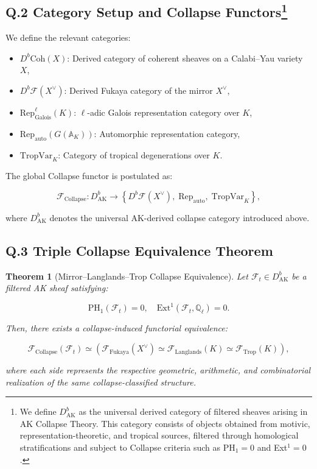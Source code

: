 \documentclass[11pt]{article}
\newtheorem{theorem}{Theorem}[section]
\begin{document}
\subsection*{Q.2 Category Setup and Collapse Functors\footnote{%
We define $D^b_{\mathrm{AK}}$ as the universal derived category of filtered sheaves arising in AK Collapse Theory. 
This category consists of objects obtained from motivic, representation-theoretic, and tropical sources, filtered through homological stratifications and subject to Collapse criteria such as PH$_1 = 0$ and Ext$^1 = 0$.
}}

We define the relevant categories:

\begin{itemize}
  \item $D^b\mathrm{Coh}(X)$: Derived category of coherent sheaves on a Calabi–Yau variety $X$,
  \item $D^b\mathcal{F}(X^\vee)$: Derived Fukaya category of the mirror $X^\vee$,
  \item $\mathrm{Rep}^\ell_{\mathrm{Galois}}(K)$: $\ell$-adic Galois representation category over $K$,
  \item $\mathrm{Rep}_{\mathrm{auto}}(G(\mathbb{A}_K))$: Automorphic representation category,
  \item $\mathrm{TropVar}_K$: Category of tropical degenerations over $K$.
\end{itemize}

The global Collapse functor is postulated as:

\[
\mathcal{F}_{\mathrm{Collapse}} :
D^b_{\mathrm{AK}} \longrightarrow
\left\{
D^b\mathcal{F}(X^\vee),\;
\mathrm{Rep}_{\mathrm{auto}},\;
\mathrm{TropVar}_K
\right\},
\]

where $D^b_{\mathrm{AK}}$ denotes the universal AK-derived collapse category introduced above.

\subsection*{Q.3 Triple Collapse Equivalence Theorem}

\begin{theorem}[Mirror–Langlands–Trop Collapse Equivalence]
Let $\mathcal{F}_t \in D^b_{\mathrm{AK}}$ be a filtered AK sheaf satisfying:

\[
\mathrm{PH}_1(\mathcal{F}_t) = 0, \quad \mathrm{Ext}^1(\mathcal{F}_t, \mathbb{Q}_\ell) = 0.
\]

Then, there exists a collapse-induced functorial equivalence:

\[
\mathcal{F}_{\mathrm{Collapse}}(\mathcal{F}_t) \simeq
\left(
\mathcal{F}_{\mathrm{Fukaya}}(X^\vee)
\simeq
\mathcal{F}_{\mathrm{Langlands}}(K)
\simeq
\mathcal{F}_{\mathrm{Trop}}(K)
\right),
\]

where each side represents the respective geometric, arithmetic, and combinatorial realization of the same collapse-classified structure.
\end{theorem}
\end{document}
